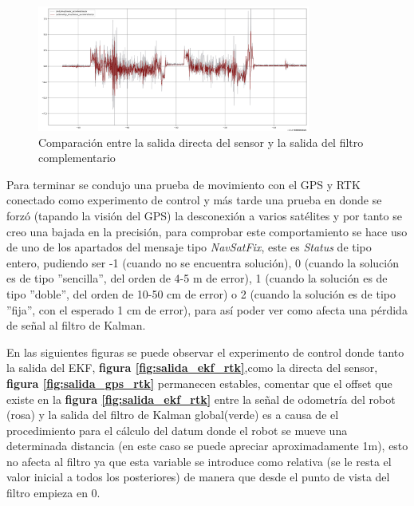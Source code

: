 \begin{figure}[H]
    \centering
    \includegraphics[width=0.8\textwidth]{images/ousterIMu_vscomplementary.png}
    \caption{Comparación entre la salida directa del sensor y la salida del filtro complementario}
    \label{fig:complementariovsouster}
\end{figure}

Para terminar se condujo una prueba de movimiento con el GPS y RTK conectado como experimento de control y más tarde una prueba en donde se forzó (tapando la visión del GPS) la desconexión a varios 
satélites y por tanto se creo una bajada en la precisión, para comprobar este comportamiento se hace uso de uno de los apartados del mensaje tipo \textit{NavSatFix}, este es \textit{Status} de tipo entero,
pudiendo ser -1 (cuando no se encuentra solución), 0 (cuando la solución es de tipo ''sencilla'', del orden de 4-5 m de error), 1 (cuando la solución es de tipo ''doble'', del orden de 10-50 cm de error) o 2 
(cuando la solución es de tipo ''fija'', con el esperado 1 cm de error), para así poder ver como afecta una pérdida de señal al filtro de Kalman.

En las siguientes figuras se puede observar el experimento de control donde tanto la salida del EKF, \textbf{figura \ref{fig:salida_ekf_rtk}},como la directa del sensor, \textbf{figura \ref{fig:salida_gps_rtk}} 
permanecen estables, comentar que el offset que existe en la \textbf{figura \ref{fig:salida_ekf_rtk}} entre la señal de odometría del robot (rosa) y la salida del filtro de Kalman global(verde) es a causa de 
el procedimiento para el cálculo del datum donde el robot se mueve una determinada distancia (en este caso se puede apreciar aproximadamente 1m), esto no afecta al filtro ya que esta variable se introduce como relativa (se le resta el valor inicial a todos los posteriores) de manera 
que desde el punto de vista del filtro empieza en 0.

